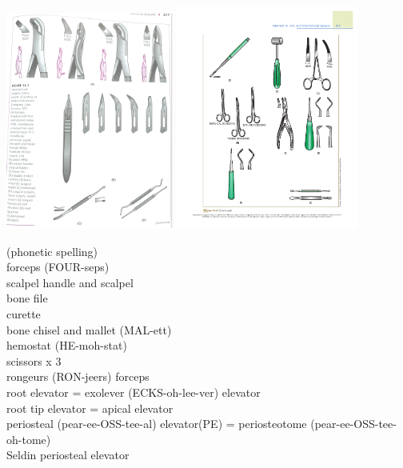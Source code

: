 \documentclass[
paper=landscape,
paper=160mm:90mm, %
fontsize=11pt, %
pagesize, %
parskip=half-, %
]{scrartcl} %
\theoremstyle{mythmstyle} %
\begin{document}
\begin{center}
\includegraphics[width=5.5cm]{p217.pdf}
\includegraphics[width=6cm]{p257.pdf}
\end{center}
\clearpage
\noindent (phonetic spelling)\\
forceps (FOUR-seps)\\
scalpel handle and scalpel\\
bone file\\%
curette\\
bone chisel and mallet (MAL-ett)\\
hemostat (HE-moh-stat)\\
scissors x 3\\
rongeurs (RON-jeers) forceps\\[2mm]
root elevator = exolever (ECKS-oh-lee-ver) elevator\\
root tip elevator = apical elevator\\[2mm]
periosteal (pear-ee-OSS-tee-al) elevator(PE) = periosteotome  (pear-ee-OSS-tee-oh-tome)\\
Seldin periosteal elevator\\
\end{document}
